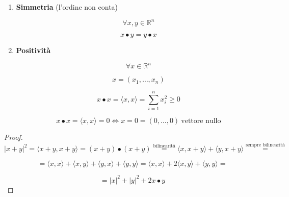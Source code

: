 \documentclass[11pt]{article}
\begin{document}
\begin{itemize}
\begin{enumerate}
            \item \textbf{Simmetria} (l'ordine non conta)

                \[
                    \forall x,y \in \mathbb{R}^{n}
                \]

                \[
                    x \bullet y = y \bullet x
                \]

            \item \textbf{Positività} 
                
                \[
                    \forall x \in  \mathbb{R}^{n}
                \]

                \[
                    x=(x_1, \ldots ,x_n)
                \]

                \[
                    x \bullet x = \langle x,x \rangle = \sum^{n}_{i=1} x_i^{2}\ge 0
                \]

                \[
                    x \bullet x = \langle x,x \rangle = 0 \Leftrightarrow x = 0 = (0, \ldots ,0)\ \text{vettore nullo}
                \]

        \end{enumerate}



           
\end{itemize}

\newpage


\begin{proof}
       \[
           |x+ y| ^{2} = \langle x+y , x+y \rangle = (x+y) \bullet (x+y) \overset{\text{bilinearità}}{=} \langle x,x+y \rangle + \langle y,x+y \rangle \overset{\text{sempre bilinearità}}{=} 
       \]    

       \[
           =\langle x,x \rangle + \langle x,y \rangle + \langle y,x \rangle + \langle y,y \rangle = \langle x,x \rangle + 2\langle x,y \rangle + \langle y,y \rangle= 
       \]

       \[
            = |x|^{2} + |y|^{2} + 2x \bullet y
       \]
\end{proof}
\end{document}
